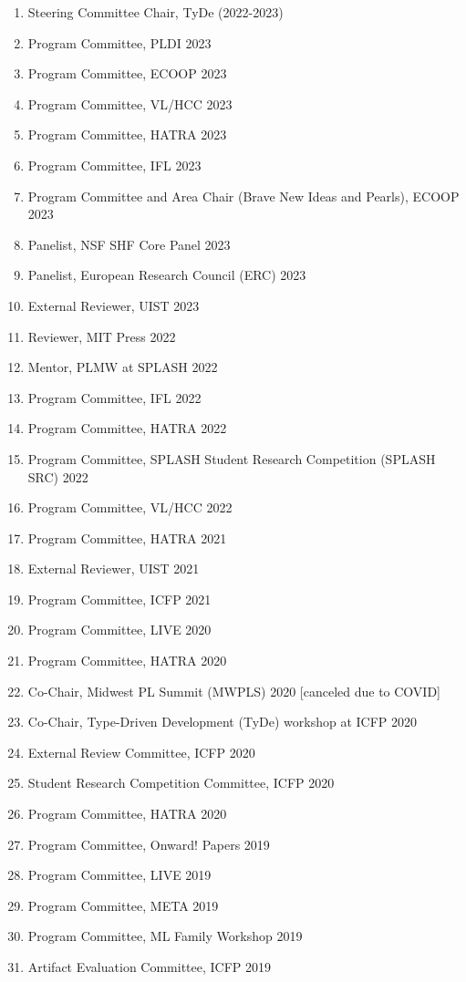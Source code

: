 \documentclass[10pt,letterpaper]{article}
\begin{document}
\begin{enumerate}
  \item Steering Committee Chair, TyDe (2022-2023)
  \item Program Committee, PLDI 2023
  \item Program Committee, ECOOP 2023
  \item Program Committee, VL/HCC 2023
  \item Program Committee, HATRA 2023
  \item Program Committee, IFL 2023
  \item Program Committee and Area Chair (Brave New Ideas and Pearls), ECOOP 2023
  \item Panelist, NSF SHF Core Panel 2023
  \item Panelist, European Research Council (ERC) 2023
  \item External Reviewer, UIST 2023
  \item Reviewer, MIT Press 2022
  \item Mentor, PLMW at SPLASH 2022
  \item Program Committee, IFL 2022
  \item Program Committee, HATRA 2022
  \item Program Committee, SPLASH Student Research Competition (SPLASH SRC) 2022
  \item Program Committee, VL/HCC 2022
  \item Program Committee, HATRA 2021
  \item External Reviewer, UIST 2021
  \item Program Committee, ICFP 2021
  \item Program Committee, LIVE 2020
  \item Program Committee, HATRA 2020
  \item Co-Chair, Midwest PL Summit (MWPLS) 2020 [canceled due to COVID]
  \item Co-Chair, Type-Driven Development (TyDe) workshop at ICFP 2020
  \item External Review Committee, ICFP 2020
  \item Student Research Competition Committee, ICFP 2020
  \item Program Committee, HATRA 2020
  \item Program Committee, Onward! Papers 2019
  \item Program Committee, LIVE 2019
  \item Program Committee, META 2019
  \item Program Committee, ML Family Workshop 2019
  \item Artifact Evaluation Committee, ICFP 2019

\end{enumerate}
\end{document}
